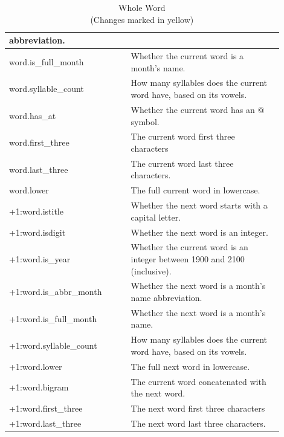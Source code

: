 \documentclass[a4paper, conference]{ieeeconf}
\begin{document}
\begin{table}[ht!]
\begin{tabular}{|p{0.4\linewidth}|p{0.5\linewidth}|}
      abbreviation. \\
      \hline
      \rowcolor{blue}
      word.is\_full\_month & Whether the current word is a month's name. \\
      \hline
      \rowcolor{blue}
      word.syllable\_count & How many syllables does the current word have,
      based on its vowels. \\
      \hline
      \rowcolor{blue}
      word.has\_at & Whether the current word has an @ symbol. \\
      \hline
      \rowcolor{blue}
      word.first\_three & The current word first three characters \\
      \hline
      \rowcolor{blue}
      word.last\_three & The current word last three characters. \\
      \hline
      \rowcolor{pale_yellow}
      word.lower & The full current word in lowercase. \\
      \hline
      \rowcolor{light_blue}
      +1:word.istitle & Whether the next word starts with a capital letter. \\
      \hline
      \rowcolor{light_blue}
      +1:word.isdigit & Whether the next word is an integer. \\
      \hline
      \rowcolor{light_blue}
      +1:word.is\_year & Whether the current word is an integer between 1900
      and 2100 (inclusive). \\
      \hline
      \rowcolor{light_blue}
      +1:word.is\_abbr\_month & Whether the next word is a month's name
      abbreviation. \\
      \hline
      \rowcolor{light_blue}
      +1:word.is\_full\_month & Whether the next word is a month's name. \\
      \hline
      \rowcolor{light_blue}
      +1:word.syllable\_count & How many syllables does the current word have,
      based on its vowels. \\
      \hline
      \rowcolor{light_blue}
      +1:word.lower & The full next word in lowercase. \\
      \hline
      \rowcolor{light_blue}
      +1:word.bigram & The current word concatenated with the next word. \\
      \hline
      \rowcolor{light_blue}
      +1:word.first\_three & The next word first three characters \\
      \hline
      \rowcolor{light_blue}
      +1:word.last\_three & The next word last three characters. \\
      \hline
    \end{tabular}
    \caption{Whole Word \\ \textnormal{(Changes marked in yellow)}}
    \label{table:3}
  \end{table}
\end{document}
